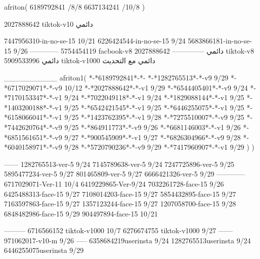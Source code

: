 afriton(
6189792841 /8/8
6637134241 /10/8
)

2027888642 tiktok-v10
دائمي


7447956310-in-no-se-15 10/21
6226424544-in-no-se-15 9/24
5683866181-in-no-se-15 9/26
------------
5754454119 facbook-v8
دائمي
--------------
2027888642 tiktok-v8
دائمي
5909533996 tiktok-v1000
دائمي مع التحديث

__________
afriton1(
*-*6189792841*-*-
*-*1282765513*-*-v9 9/29
*-*6717029071*-*-v9 10/12
*-*2027888642*-*-v1 9/29
*-*6544405401*-*-v9 9/24
*-*7170153347*-*-v1 9/24
*-*7022049118*-*-v1 9/24
*-*1829088144*-*-v1 9/25
*-*1403200188*-*-v1 9/25
*-*6542421545*-*-v1 9/25
*-*6446255075*-*-v1 9/25
*-*6158066041*-*-v1 9/25
*-*1423762395*-*-v1 9/28
*-*7275510007*-*-v9 9/25
*-*7442620764*-*-v9 9/25
*-*864911773*-*-v9 9/26
*-*6681146003*-*-v1 9/26
*-*6851561651*-*-v9 9/27
*-*900545909*-*-v1 9/27
*-*6826304966*-*-v9 9/28
*-*6040158971*-*-v9 9/28
*-*5720790236*-*-v9 9/29
*-*7417960907*-*-v1 9/29
)
)

------
1282765513-ver-5 9/24
7145789638-ver-5 9/24
7247725896-ver-5 9/25
5895477234-ver-5 9/27
801465809-ver-5 9/27
6666421326-ver-5 9/29
------------
6717029071-Ver-11
10/4
6419229865-Ver-9/24
7032261728-face-15 9/26
6425488313-face-15 9/27
7108014203-face-15 9/27
5854432895-face-15 9/27
7163597863-face-15 9/27
1357123244-face-15 9/27
1207058700-face-15 9/28
6848482986-face-15 9/29
904497894-face-15 10/21

---------
6716566152 tiktok-v1000
10/7
6276674755 tiktok-v1000
9/27
------
971062017-v10-m 9/26
-----
6358684219userinsta 9/24
1282765513userinsta 9/24
6446255075userinsta 9/29
